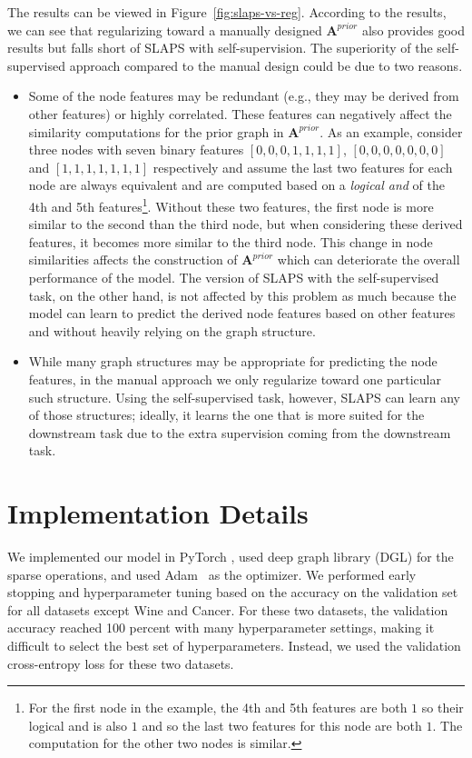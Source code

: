 \documentclass{article}
\def\mA{{\bm{A}}}
\begin{document}
The results can be viewed in Figure~\ref{fig:slaps-vs-reg}. According to the results, we can see that regularizing toward a manually designed $\mA^{prior}$ also provides good results but falls short of SLAPS with self-supervision. The superiority of the self-supervised approach compared to the manual design could be due to two reasons. 
\begin{itemize}
\item Some of the node features may be redundant (e.g., they may be derived from other features) or highly correlated. These features can negatively affect the similarity computations for the prior graph in $\mA^{prior}$. As an example, consider three nodes with seven binary features $[0, 0, 0, 1, 1, 1, 1]$, $[0, 0, 0, 0, 0, 0, 0]$ and $[1, 1, 1, 1, 1, 1, 1]$ respectively and assume the last two features for each node are always equivalent and are computed based on a \emph{logical and} of the 4th and 5th features\footnote{For the first node in the example, the 4th and 5th features are both $1$ so their logical and is also $1$ and so the last two features for this node are both $1$. The computation for the other two nodes is similar.}. Without these two features, the first node is more similar to the second than the third node, but when considering these derived features, it becomes more similar to the third node. This change in node similarities affects the construction of $\mA^{prior}$ which can deteriorate the overall performance of the model. The version of SLAPS with the self-supervised task, on the other hand, is not affected by this problem as much because the model can learn to predict the derived node features based on other features and without heavily relying on the graph structure.

\item While many graph structures may be appropriate for predicting the node features, in the manual approach we only regularize toward one particular such structure. Using the self-supervised task, however, SLAPS can learn any of those structures; ideally, it learns the one that is more suited for the downstream task due to the extra supervision coming from the downstream task.
\end{itemize}

\section{Implementation Details}
We implemented our model in PyTorch \citep{paszke2017automatic}, used deep graph library (DGL) \citep{wang2019deep} for the sparse operations, and used Adam~\citep{adam} as the optimizer. We performed early stopping and hyperparameter tuning based on the accuracy on the validation set for all datasets except Wine and Cancer. For these two datasets, the validation accuracy reached 100 percent with many hyperparameter settings, making it difficult to select the best set of hyperparameters. Instead, we used the validation cross-entropy loss for these two datasets. 
\end{document}
